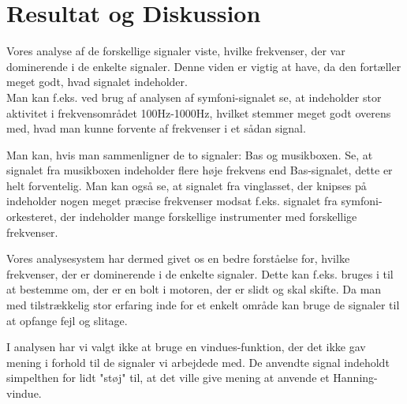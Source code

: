 \chapter{Resultat og Diskussion}\label{ch:Resultat og Diskussion}

Vores analyse af de forskellige signaler viste, hvilke frekvenser, der var dominerende i de enkelte signaler. Denne viden er vigtig at have, da den fortæller meget godt, hvad signalet indeholder. \\Man kan f.eks. ved brug af analysen af symfoni-signalet se, at indeholder stor aktivitet i frekvensområdet 100Hz-1000Hz, hvilket stemmer meget godt overens med, hvad man kunne forvente af frekvenser i et sådan signal.

Man kan, hvis man sammenligner de to signaler: Bas og musikboxen. Se, at signalet fra musikboxen indeholder flere høje frekvens end Bas-signalet, dette er helt forventelig. Man kan også se, at signalet fra vinglasset, der knipses på indeholder nogen meget præcise frekvenser modsat f.eks. signalet fra symfoni-orkesteret, der indeholder mange forskellige instrumenter med forskellige frekvenser.

Vores analysesystem har dermed givet os en bedre forståelse for, hvilke frekvenser, der er dominerende i de enkelte signaler. Dette kan f.eks. bruges i til at bestemme om, der er en bolt i motoren, der er slidt og skal skifte. Da man med tilstrækkelig stor erfaring inde for et enkelt område kan bruge de signaler til at opfange fejl og slitage.

I analysen har vi valgt ikke at bruge en vindues-funktion, der det ikke gav mening i forhold til de signaler vi arbejdede med. De anvendte signal indeholdt simpelthen for lidt "støj" til, at det ville give mening at anvende et Hanning-vindue.
